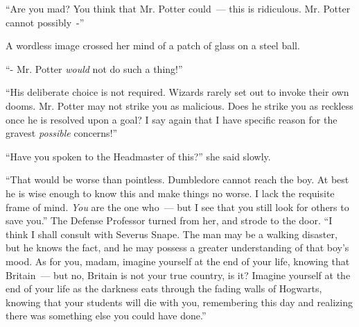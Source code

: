 ``Are you mad? You think that Mr. Potter could~--- this is ridiculous. Mr. Potter cannot possibly~-''

A wordless image crossed her mind of a patch of glass on a steel ball.

``- Mr. Potter \emph{would} not do such a thing!''

``His deliberate choice is not required. Wizards rarely set out to invoke their own dooms. Mr. Potter may not strike you as malicious. Does he strike you as reckless once he is resolved upon a goal? I say again that I have specific reason for the gravest \emph{possible} concerns!''

``Have you spoken to the Headmaster of this?'' she said slowly.

``That would be worse than pointless. Dumbledore cannot reach the boy. At best he is wise enough to know this and make things no worse. I lack the requisite frame of mind. \emph{You} are the one who~--- but I see that you still look for others to save you.'' The Defense Professor turned from her, and strode to the door. ``I think I shall consult with Severus Snape. The man may be a walking disaster, but he knows the fact, and he may possess a greater understanding of that boy's mood. As for you, madam, imagine yourself at the end of your life, knowing that Britain~--- but no, Britain is not your true country, is it? Imagine yourself at the end of your life as the darkness eats through the fading walls of Hogwarts, knowing that your students will die with you, remembering this day and realizing there was something else you could have done.''
